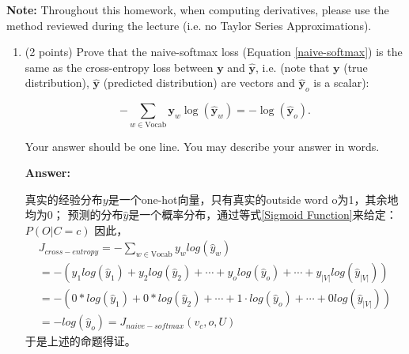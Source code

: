 \documentclass{article}
\newenvironment{answer}{
    {\bf Answer:} \sf \begingroup \color{red}%
}{\par\endgroup}%
\begin{document}
\textbf{Note:} Throughout this homework, when computing derivatives, please use the method reviewed during the lecture (i.e. no Taylor Series Approximations).

\clearpage 
\begin{enumerate}[label=(\alph*)]
\item (2 points) 
Prove that the naive-softmax loss (Equation \ref{naive-softmax}) is the same as the cross-entropy loss between $\bm y$  and $\hat{\bm y}$, i.e. (note that $\bm y$ 
 (true distribution), $\hat{\bm y}$ (predicted distribution) are vectors and $\hat{\bm y}_o$ is a scalar):

\begin{equation} 
-\sum_{w \in \text{Vocab}} \bm y_w \log(\hat{\bm y}_w) = - \log (\hat{\bm y}_o).
\end{equation}

Your answer should be one line. You may describe your answer in words.
\begin{shaded}
\begin{answer}
真实的经验分布$y$是一个one-hot向量，只有真实的outside word o为1，其余地均为0；
预测的分布$\hat{y}$是一个概率分布，通过等式\ref{Sigmoid Function}来给定：$P(O|C=c)$
因此，
\begin{equation}
\begin{array}{l}
		J_{cross-entropy}=-\sum_{w\in \text{Vocab}}y_w log(\hat{y}_w) \\= -(y_1 log(\hat{y}_1)+y_2 log(\hat{y}_2) + \cdots + y_o log(\hat{y}_o)+\cdots + y_{|V|}log(\hat{y}_{|V|})) \\
		= -(0*log(\hat{y}_1)+0*log(\hat{y}_2)+\cdots + 1\cdot log(\hat{y}_o)+\cdots+0log(\hat{y}_{|V|}))\\
		= -log(\hat{y}_o) = J_{naive-softmax}(v_c,o,U)
\end{array}
\end{equation}
于是上述的命题得证。
\end{answer}
\end{shaded}


\end{enumerate}
\end{document}
